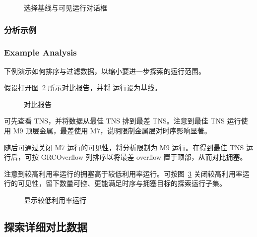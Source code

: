 \begin{figure}[htbp]
\centering
{}
\caption{选择基线与可见运行对话框}
\label{fig:choose-runs}
\end{figure}

\subsubsection{分析示例}
\subsubsection*{Example Analysis}

下例演示如何排序与过滤数据，以缩小要进一步探索的运行范围。

假设打开图~\ref{fig:cmp-report} 所示对比报告，并将  运行设为基线。

\begin{figure}[htbp]
\centering
{}
\caption{对比报告}
\label{fig:cmp-report}
\end{figure}

可先查看 TNS，并将数据从最佳 TNS 排到最差 TNS。注意到最佳 TNS 运行使用 M9 顶层金属，最差使用 M7，说明限制金属层对时序影响显著。

随后可通过关闭 M7 运行的可见性，将分析限制为 M9 运行。在得到最佳 TNS 运行后，可按 GRCOverflow 列排序以将最差 overflow 置于顶部，从而对比拥塞。

注意到较高利用率运行的拥塞高于较低利用率运行。可按图~\ref{fig:lower-util} 关闭较高利用率运行的可见性，留下数量可控、更能满足时序与拥塞目标的探索运行子集。

\begin{figure}[htbp]
\centering
{}
\caption{显示较低利用率运行}
\label{fig:lower-util}
\end{figure}

\subsection{探索详细对比数据}
